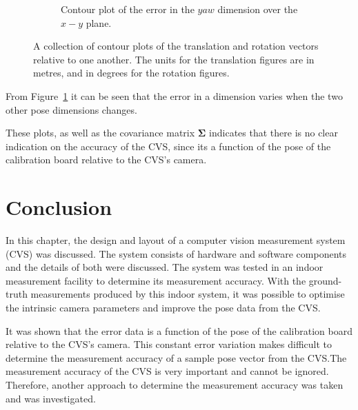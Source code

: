 \begin{figure}
\begin{subfigure}{0.31\textwidth}
    \caption{Contour plot of the error in the $yaw$ dimension over the $x-y$ plane.}
  \end{subfigure}
  \caption[A collection of contour plots of the translation and rotation vectors relative to one another]{A collection of contour plots of the translation and rotation vectors relative to one another. The units for the translation figures are in metres, and in degrees for the rotation figures. }
  \label{fig:err-contour}
\end{figure}

From Figure~\ref{fig:err-contour} it can be seen that the error in a dimension varies when the two other pose dimensions changes. 

These plots, as well as the covariance matrix $\bm{\Sigma}$ indicates that there is no clear indication on the accuracy of the CVS, since its a function of the pose of the calibration board relative to the CVS's camera. 

\section{Conclusion}

In this chapter, the design and layout of a computer vision measurement system (CVS) was discussed. The system consists of hardware and software components and the details of both were discussed. The system was tested in an indoor measurement facility to determine its measurement accuracy. With the ground-truth measurements produced by this indoor system, it was possible to optimise the intrinsic camera parameters and improve the pose data from the CVS.

It was shown that the error data is a function of the pose of the calibration board relative to the CVS's camera. This constant error variation makes difficult to determine the measurement accuracy of a sample pose vector from the CVS.\@ The measurement accuracy of the CVS is very important and cannot be ignored. Therefore, another approach to determine the measurement accuracy was taken and was investigated. 
